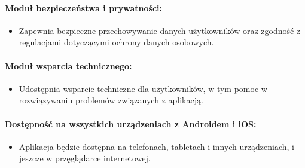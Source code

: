 \paragraph{Moduł bezpieczeństwa i prywatności:}
\begin{itemize}
  \item Zapewnia bezpieczne przechowywanie danych użytkowników oraz zgodność z regulacjami dotyczącymi ochrony danych osobowych.
\end{itemize}

\paragraph{Moduł wsparcia technicznego:}
\begin{itemize}
  \item Udostępnia wsparcie techniczne dla użytkowników, w tym pomoc w rozwiązywaniu problemów związanych z aplikacją.
\end{itemize}

\paragraph{Dostępność na wszystkich urządzeniach z Androidem i iOS:}
\begin{itemize}
  \item Aplikacja będzie dostępna na telefonach, tabletach i innych urządzeniach, i jeszcze w przęglądarce internetowej.
\end{itemize}

